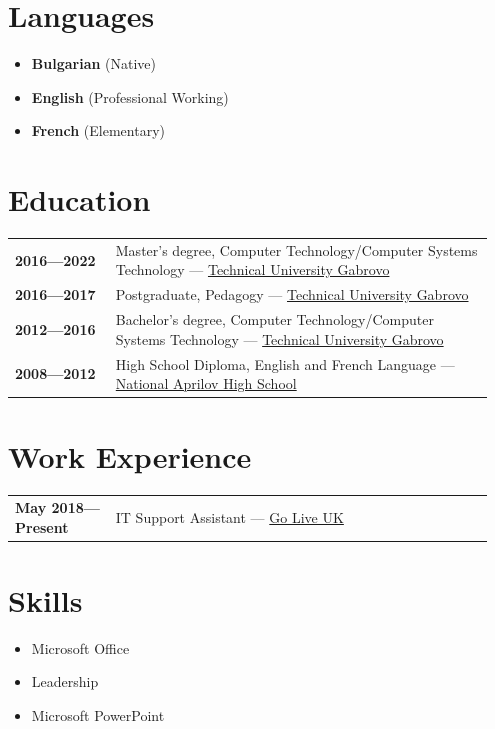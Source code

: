 \documentclass[letterpaper,10pt]{article}
\begin{document}
\begin{minipage}[t]{0.4\textwidth}
		\section*{Languages}
		\begin{itemize}
			\item \textbf{Bulgarian} (Native)
			\item \textbf{English} (Professional Working)
			\item \textbf{French} (Elementary)
		\end{itemize}
	\end{minipage}
	\hfill
	\begin{minipage}[t]{0.5\textwidth}
		\section*{Education}
		\begin{tabular}{@{}p{0.2\linewidth} p{0.75\linewidth}}
			\textbf{2016—2022} & Master's degree, Computer Technology/Computer Systems
			Technology — \href{https://www.tugab.bg/en/}{Technical University Gabrovo} \\
			\textbf{2016—2017} & Postgraduate, Pedagogy — \href{https://www.tugab.bg/en/}{Technical University Gabrovo} \\
			\textbf{2012—2016} & Bachelor's degree, Computer Technology/Computer Systems
			Technology — \href{https://www.tugab.bg/en/}{Technical University Gabrovo} \\
			\textbf{2008—2012} & High School Diploma, English and French Language — \href{https://nag-school.org/}{National Aprilov High School} \\
		\end{tabular}
		
		\section*{Work Experience}
		\begin{tabular}{@{}p{0.2\linewidth} p{0.75\linewidth}}
			\textbf{May 2018—Present} & IT Support Assistant — \href{https://www.goliveuk.com/}{Go Live UK} \\
			
		\end{tabular}
		
		\section*{Skills}
		\begin{itemize}
			\item {Microsoft Office}
			\item {Leadership}
			\item {Microsoft PowerPoint}
		\end{itemize}
		

\end{minipage}
\end{document}
